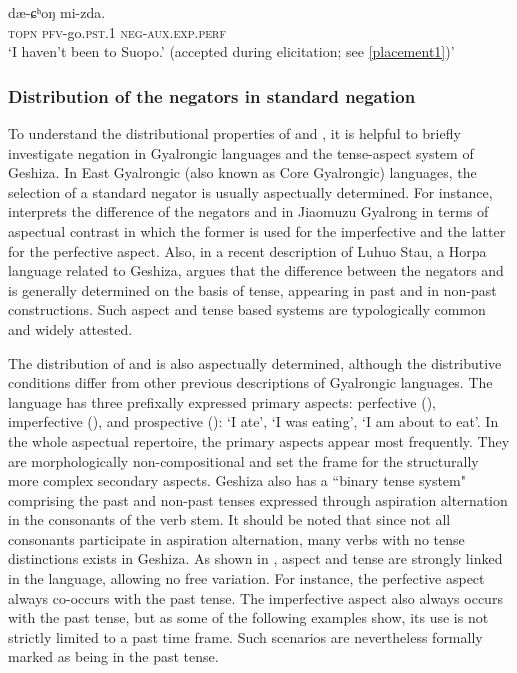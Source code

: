 \documentclass[output=paper,colorlinks,citecolor=brown]{langscibook}
\begin{document}
\ea
\label{placement2}
 {dæ-ɕʰoŋ} {mi-zda}. \\  
     \textsc{topn}  \textsc{pfv}-go.\textsc{pst.1} \textsc{neg-aux.exp.perf}\\
\glt `I haven't been to Suopo.' (accepted during elicitation; see \ref{placement1})'
\z

\subsubsection{Distribution of the negators in standard negation}
To understand the distributional properties of  and , it is helpful to briefly investigate negation in Gyalrongic languages and the tense-aspect system of Geshiza. In East Gyalrongic (also known as Core Gyalrongic) languages, the selection of a standard negator is usually aspectually determined. For instance, \citet [529]{Prins2011} interprets the difference of the negators  and  in Jiaomuzu Gyalrong  in terms of aspectual contrast in which the former is used for the imperfective and the latter for the perfective aspect. 
Also, in a recent description of Luhuo Stau, a Horpa language related to Geshiza, \citet[381--385]{Tunzhi2019} argues that the difference between the negators  and  is generally determined on the basis of tense,  appearing in past and  in non-past constructions.
Such aspect and tense based systems are typologically common and widely attested.


The distribution of  and  is also aspectually determined, although the distributive conditions differ from other previous descriptions of Gyalrongic languages. The language has three prefixally expressed primary aspects: perfective (), imperfective (), and prospective ():  `I ate',   `I was eating',  `I am about to eat'. In the whole aspectual repertoire, the primary aspects appear most frequently. They are morphologically non-compositional and set the frame for the structurally more complex secondary aspects. Geshiza also has a ``binary tense system" \citep [48--49]{Comrie1985} comprising the past and non-past tenses expressed through aspiration alternation in the consonants of the verb stem. It should be noted that since not all consonants participate in aspiration alternation, many verbs with no tense distinctions exists in Geshiza. As shown in , aspect and tense are strongly linked in the language, allowing no free variation. For instance,  the perfective aspect always co-occurs with the past tense. The imperfective aspect also always occurs with the past tense, but as some of the following examples show, its use is not strictly limited to a past time frame. Such scenarios are nevertheless formally marked as being in the past tense.
\end{document}

